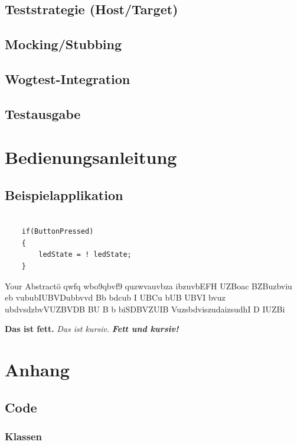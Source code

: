 \documentclass[12pt,a4paper]{article}
\begin{document}
\subsection{Teststrategie (Host/Target)}
\subsection{Mocking/Stubbing}
\subsection{Wogtest-Integration}
\subsection{Testausgabe}

\newpage
\section{Bedienungsanleitung}
\subsection{Beispielapplikation}
\begin{verbatim}

    if(ButtonPressed)
    {
        ledState = ! ledState;
    }

\end{verbatim}

Your Abstractö qwfq wbo9qbvf9 quzwvauvbza ibzuvbEFH UZBoac BZBuzbviu eb vububIUBVDubbvvd Bb bdcub I UBCu bUB UBVI bvuz ubdvsdzbvVUZBVDB BU B b  biSDBVZUIB VuzsbdviszudaizsudhI D IUZBi


\textbf{Das ist fett.}
\textit{Das ist kursiv.}
\textbf{\textit{Fett und kursiv!}}

\newpage
\section{Anhang}
\subsection{Code}
\subsubsection{Klassen}
\end{document}
